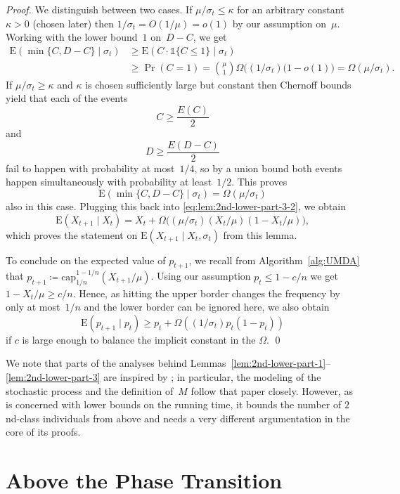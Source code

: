 \documentclass[11pt, a4paper]{article}
\DeclareMathOperator{\Prob}{Pr}
\newcommand*{\E}{\mathrm{E}}
\newcommand{\indic}[1]{\mathds{1}\{#1\}}
\begin{document}
\begin{proof}
		We distinguish between two cases. If $\mu/\sigma_t \le \kappa$ for an arbitrary constant~$\kappa>0$ (chosen later) 
		then 
		$1/\sigma_t=O(1/\mu)=o(1)$ by our assumption on~$\mu$. 
		Working with the lower bound~$1$ on~$D-C$, we get 
		\begin{align*}
		\E(\min\{C,D-C\}\mid  \sigma_t) & \ge 
		\E(C\cdot \indic{C\le 1} \mid \sigma_t) \\
		& \ge \Prob(C=1) = \binom{\mu}{1} \Omega\bigl((1/\sigma_t)(1-o(1)\bigr) 
		 = \Omega(\mu/\sigma_t).
		\end{align*}
		If $\mu/\sigma_t \ge \kappa$ and $\kappa$ is chosen sufficiently large but constant then Chernoff bounds yield that 
		each of the events 
		\[
		C \ge \frac{E(C)}{2}
		\]
		and 
		\[
		D\ge \frac{E(D-C)}{2}
		\]
		fail to happen 
		with probability at most~$1/4$, so by a union bound both events 
		happen simultaneously with probability at least~$1/2$. This proves 
		\[
		\E(\min\{C,D-C\}\mid \sigma_t) = \Omega(\mu/\sigma_t)
		\]
		also in this case.
		Plugging this back into \eqref{eq:lem:2nd-lower-part-3-2}, we obtain 
		\[
		\E(X_{t+1}\mid X_t) = X_t +  \Omega\bigl((\mu/\sigma_t)(X_t/\mu) (1-X_t/\mu)\bigr),
		\]
		which proves the statement on $\E(X_{t+1}\mid X_t,\sigma_t)$ from this lemma. 
		
		To conclude on the expected value of $p_{t+1}$, we recall from Algorithm~\ref{alg:UMDA} that 
		$p_{t+1}\coloneqq \mathrm{cap}_{1/n}^{1-1/n} (X_{t+1}/\mu)$. Using our assumption $p_t\le 1-c/n$ we get 
		$1-X_{t}/\mu \ge c/n  $. Hence, 
		as hitting the upper border changes the frequency by only at most~$1/n$ and the lower border 
		can be ignored here, we also 
		obtain  
		\[
		\E(p_{t+1}\mid p_t) \ge p_t +  \Omega((1/\sigma_t)p_t (1-p_t))
		\]
		if $c$ is large enough to balance the implicit constant in the $\Omega$. 
\qed\end{proof}

We note that parts of the analyses behind Lemmas~\ref{lem:2nd-lower-part-1}--\ref{lem:2nd-lower-part-3} are 
inspired by \cite{KrejcaWittFOGA2017}; in particular, 
the modeling of the stochastic process and the definition of~$M$ follow 
that paper closely. However, 
as \cite{KrejcaWittFOGA2017} is concerned with lower bounds on the running time, it  bounds the number 
of $2$nd-class individuals from above and needs a very different argumentation in the core 
of its proofs.


\section{Above the Phase Transition}
\label{sec:upperBound}
\end{document}

